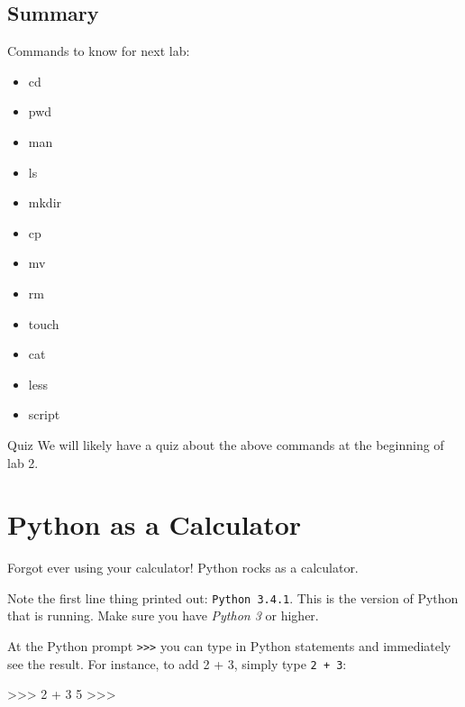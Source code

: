 \documentclass[11pt]{cselabheader}
\begin{document}
\subsection{Summary}

Commands to know for next lab:
\begin{multicols}{3}
\begin{itemize}
  \item cd
  \item pwd
  \item man
  \item ls
  \item mkdir
  \item cp
  \item mv
  \item rm
  \item touch
  \item cat
  \item less
  \item script
\end{itemize}
\end{multicols}

\begin{warningbox}{Quiz}
  We will likely have a quiz about the above commands at the beginning of lab 2.
\end{warningbox}

\pagebreak
\section{Python as a Calculator}
\label{sec:python-calc}
Forgot ever using your calculator! Python rocks as a calculator.


Note the first line thing printed out: \texttt{Python 3.4.1}. This is the
version of Python that is running. Make sure you have \emph{Python 3} or higher.

At the Python prompt \texttt{>>>} you can type in Python statements and
immediately see the result. For instance, to add 2 + 3, simply type \texttt{2 +
3}: 

\begin{python3code}
>>> 2 + 3
5
>>>
\end{python3code}
\end{document}
